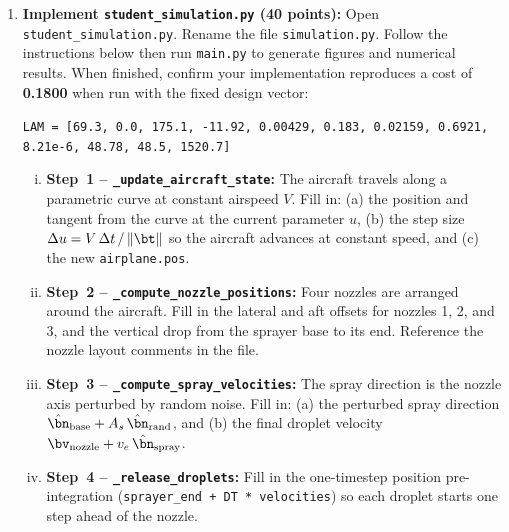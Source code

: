 \documentclass{article}
\begin{document}
\begin{enumerate}
In a sentence, why is $x_0$ fixed at $0$ rather than included in the optimization?

\begin{answer}
\end{answer}

\item[2. (b)] \textbf{Implement \texttt{student\_simulation.py} (40 points):}
Open \texttt{student\_simulation.py}. Rename the file \texttt{simulation.py}. Follow the instructions below then run \texttt{main.py} to generate figures and numerical results.
When finished, confirm your implementation reproduces a cost of \textbf{0.1800} when run with the fixed design vector:
\begin{center}
\texttt{LAM = [69.3, 0.0, 175.1, -11.92, 0.00429, 0.183, 0.02159, 0.6921, 8.21e-6, 48.78, 48.5, 1520.7]}
\end{center}

\begin{enumerate}[(i)]
    \item \textbf{Step~1 -- \texttt{\_update\_aircraft\_state}:}
          The aircraft travels along a parametric curve at constant airspeed $V$.
          Fill in: (a) the position and tangent from the curve at the current parameter $u$,
          (b) the step size $\Delta u = V\,\Delta t\,/\,\|\bt\|$ so the aircraft advances at constant speed, and
          (c) the new \texttt{airplane.pos}.

    \item \textbf{Step~2 -- \texttt{\_compute\_nozzle\_positions}:}
          Four nozzles are arranged around the aircraft.
          Fill in the lateral and aft offsets for nozzles 1, 2, and 3, and the
          vertical drop from the sprayer base to its end.
          Reference the nozzle layout comments in the file.

    \item \textbf{Step~3 -- \texttt{\_compute\_spray\_velocities}:}
          The spray direction is the nozzle axis perturbed by random noise.
          Fill in: (a) the perturbed spray direction
          $\hat{\bn}_\text{base} + A_s\,\hat{\bn}_\text{rand}$, and
          (b) the final droplet velocity $\bv_\text{nozzle} + v_e\,\hat{\bn}_\text{spray}$.

    \item \textbf{Step~4 -- \texttt{\_release\_droplets}:}
          Fill in the one-timestep position pre-integration
          (\texttt{sprayer\_end + DT * velocities}) so each droplet starts
          one step ahead of the nozzle.


\end{enumerate}
\end{enumerate}
\end{document}
